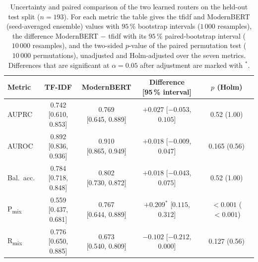 \documentclass[english, bibtex]{kththesis}               %
\numberwithin{listing}{chapter}
\begin{document}
\begin{table}[!ht]
\centering
\small
\setlength{\tabcolsep}{3.5pt}
\renewcommand{\arraystretch}{1.05}
\caption[Uncertainty and paired comparison of the two learned routers on the held-out test split]{Uncertainty and paired comparison of the two learned routers on the held-out test split ($n = 193$). For each metric the table gives the \gls{tfidf} and ModernBERT (seed-averaged ensemble) values with $95\,\%$ bootstrap intervals ($1\,000$ resamples), the difference ModernBERT $-$ \gls{tfidf} with its $95\,\%$ paired-bootstrap interval ($10\,000$ resamples), and the two-sided $p$-value of the paired permutation test ($10\,000$ permutations), unadjusted and Holm-adjusted over the seven metrics. Differences that are significant at $\alpha = 0.05$ after adjustment are marked with $^{*}$.}
\label{tab:classificationStats}
\begin{tabular}{l|cc|cc}
\textbf{Metric} & \textbf{TF-IDF} & \textbf{ModernBERT} & \makecell{\textbf{Difference}\\\textbf{[95\,\% interval]}} & \makecell{\textbf{$p$}\\\textbf{(Holm)}} \\
\hline
AUPRC & \makecell{0.742\\{}[0.610, 0.853]} & \makecell{0.769\\{}[0.645, 0.889]} & \makecell{$+0.027$\\{}[$-0.053$, $0.105$]} & 0.52 (1.00) \\[0.8em]
AUROC & \makecell{0.892\\{}[0.836, 0.936]} & \makecell{0.910\\{}[0.865, 0.949]} & \makecell{$+0.018$\\{}[$-0.009$, $0.047$]} & 0.165 (0.56) \\[0.8em]
Bal.\ acc. & \makecell{0.784\\{}[0.718, 0.848]} & \makecell{0.802\\{}[0.730, 0.872]} & \makecell{$+0.018$\\{}[$-0.043$, $0.075$]} & 0.52 (1.00) \\[0.8em]
P\textsubscript{mix} & \makecell{0.559\\{}[0.437, 0.681]} & \makecell{0.767\\{}[0.644, 0.889]} & \makecell{$+0.209^{*}$\\{}[$0.115$, $0.312$]} & $<0.001$ ($<0.001$) \\[0.8em]
R\textsubscript{mix} & \makecell{0.776\\{}[0.650, 0.885]} & \makecell{0.673\\{}[0.540, 0.809]} & \makecell{$-0.102$\\{}[$-0.212$, $0.000$]} & 0.127 (0.56) \\[0.8em]

\end{tabular}
\end{table}
\end{document}
